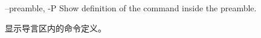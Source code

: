 \begin{docKey}
{--preamble, -P}{}%
{}%
Show definition of the command inside the preamble.

显示导言区内的命令定义。
\end{docKey}
